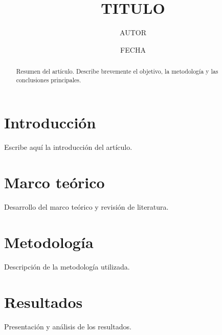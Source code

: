 \documentclass[12pt, a4paper]{article}
\title{{{TITULO}}}
\author{{{AUTOR}}}
\date{{{FECHA}}}
\theoremstyle{definition}
\theoremstyle{plain}
\begin{document}
\maketitle

\begin{abstract}
  Resumen del artículo. Describe brevemente el objetivo, la metodología
  y las conclusiones principales.
\end{abstract}

\tableofcontents
\newpage

\section{Introducción}

Escribe aquí la introducción del artículo.

\section{Marco teórico}

Desarrollo del marco teórico y revisión de literatura.

\section{Metodología}

Descripción de la metodología utilizada.

\section{Resultados}

Presentación y análisis de los resultados.

\end{document}
